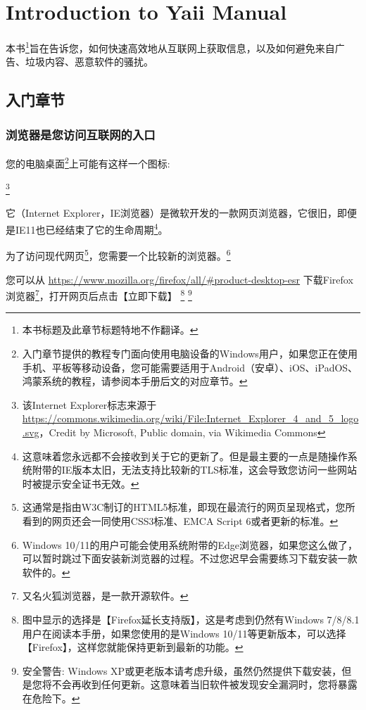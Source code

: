 \chapter{Introduction to Yaii Manual}

本书\footnote{本书标题及此章节标题特地不作翻译。}旨在告诉您，如何快速高效地从互联网上获取信息，以及如何避免来自广告、垃圾内容、恶意软件的骚扰。


\section{入门章节}

\subsection{浏览器是您访问互联网的入口}

您的电脑桌面\footnote{入门章节提供的教程专门面向使用电脑设备的Windows用户，如果您正在使用手机、平板等移动设备，您可能需要适用于Android（安卓）、iOS、iPadOS、鸿蒙系统的教程，请参阅本手册后文的对应章节。}上可能有这样一个图标: 

\footnote{该Internet Explorer标志来源于 \url{https://commons.wikimedia.org/wiki/File:Internet_Explorer_4_and_5_logo.svg}，Credit by Microsoft, Public domain, via Wikimedia Commons}

它（Internet
Explorer，IE浏览器）是微软开发的一款网页浏览器，它很旧，即便是IE11也已经结束了它的生命周期\footnote{这意味着您永远都不会接收到关于它的更新了。但是最主要的一点是随操作系统附带的IE版本太旧，无法支持比较新的TLS标准，这会导致您访问一些网站时被提示安全证书无效。}。

为了访问现代网页\footnote{这通常是指由W3C制订的HTML5标准，即现在最流行的网页呈现格式，您所看到的网页还会一同使用CSS3标准、EMCA Script 6或者更新的标准。}，您需要一个比较新的浏览器。\footnote{Windows 10/11的用户可能会使用系统附带的Edge浏览器，如果您这么做了，可以暂时跳过下面安装新浏览器的过程。不过您迟早会需要练习下载安装一款软件的。}

\newpage

您可以从 \url{https://www.mozilla.org/firefox/all/\#product-desktop-esr} 下载Firefox浏览器\footnote{又名火狐浏览器，是一款开源软件。}，打开网页后点击【立即下载】
\footnote{图中显示的选择是【Firefox延长支持版】，这是考虑到仍然有Windows
7/8/8.1用户在阅读本手册，如果您使用的是Windows
10/11等更新版本，可以选择【Firefox】，这样您就能保持更新到最新的功能。}
\footnote{安全警告: Windows XP或更老版本请考虑升级，虽然仍然提供下载安装，但是您将不会再收到任何更新。这意味着当旧软件被发现安全漏洞时，您将暴露在危险下。}

